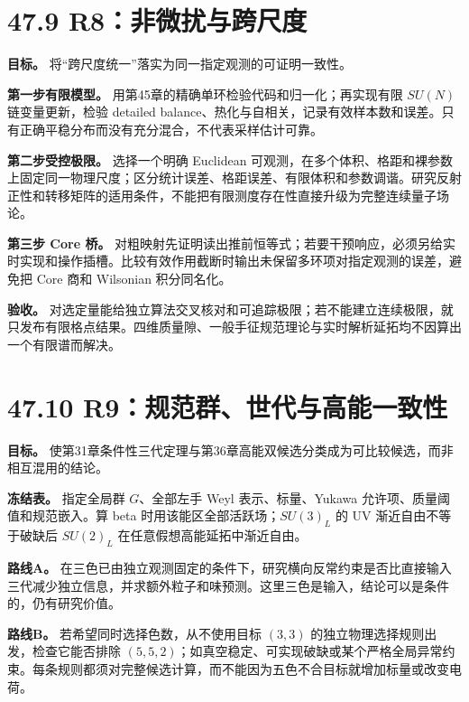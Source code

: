 \documentclass[
  11pt,
  oneside]{book}
\begin{document}
\hypertarget{r8ux975eux5faeux6270ux4e0eux8de8ux5c3aux5ea6}{%
\section{47.9
R8：非微扰与跨尺度}\label{r8ux975eux5faeux6270ux4e0eux8de8ux5c3aux5ea6}}

\textbf{目标。} 将``跨尺度统一''落实为同一指定观测的可证明一致性。

\textbf{第一步有限模型。} 用第45章的精确单环检验代码和归一化；再实现有限
\(SU(N)\) 链变量更新，检验 detailed
balance、热化与自相关，记录有效样本数和误差。只有正确平稳分布而没有充分混合，不代表采样估计可靠。

\textbf{第二步受控极限。} 选择一个明确 Euclidean
可观测，在多个体积、格距和裸参数上固定同一物理尺度；区分统计误差、格距误差、有限体积和参数调谐。研究反射正性和转移矩阵的适用条件，不能把有限测度存在性直接升级为完整连续量子场论。

\textbf{第三步 Core 桥。}
对粗映射先证明读出推前恒等式；若要干预响应，必须另给实时实现和操作插槽。比较有效作用截断时输出未保留多环项对指定观测的误差，避免把
Core 商和 Wilsonian 积分同名化。

\textbf{验收。}
对选定量能给独立算法交叉核对和可追踪极限；若不能建立连续极限，就只发布有限格点结果。四维质量隙、一般手征规范理论与实时解析延拓均不因算出一个有限谱而解决。

\hypertarget{r9ux89c4ux8303ux7fa4ux4e16ux4ee3ux4e0eux9ad8ux80fdux4e00ux81f4ux6027}{%
\section{47.10
R9：规范群、世代与高能一致性}\label{r9ux89c4ux8303ux7fa4ux4e16ux4ee3ux4e0eux9ad8ux80fdux4e00ux81f4ux6027}}

\textbf{目标。}
使第31章条件性三代定理与第36章高能双候选分类成为可比较候选，而非相互混用的结论。

\textbf{冻结表。} 指定全局群 \(G\)、全部左手 Weyl 表示、标量、Yukawa
允许项、质量阈值和规范嵌入。算 beta 时用该能区全部活跃场；\(SU(3)_L\) 的
UV 渐近自由不等于破缺后 \(SU(2)_L\) 在任意假想高能延拓中渐近自由。

\textbf{路线A。}
在三色已由独立观测固定的条件下，研究横向反常约束是否比直接输入三代减少独立信息，并求额外粒子和味预测。这里三色是输入，结论可以是条件的，仍有研究价值。

\textbf{路线B。} 若希望同时选择色数，从不使用目标 \((3,3)\)
的独立物理选择规则出发，检查它能否排除
\((5,5,2)\)；如真空稳定、可实现破缺或某个严格全局异常约束。每条规则都须对完整候选计算，而不能因为五色不合目标就增加标量或改变电荷。
\end{document}
